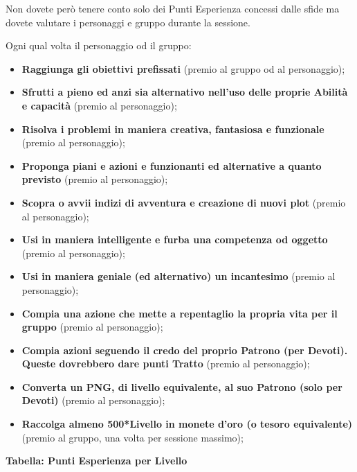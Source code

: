 \begin{multicols}{2}
\medskip

Non dovete però tenere conto solo dei Punti Esperienza concessi dalle sfide ma dovete valutare i personaggi e gruppo durante la sessione.

Ogni qual volta il personaggio od il gruppo:\label{puntiesperienzabonus}
\begin{itemize}[leftmargin=*] \setlength{\itemsep}{0pt}
\item \textbf{Raggiunga gli obiettivi prefissati} (premio al gruppo od al personaggio);
\item \textbf{Sfrutti a pieno ed anzi sia alternativo nell'uso delle proprie Abilità e capacità} (premio al personaggio);
\item \textbf{Risolva i problemi in maniera creativa, fantasiosa e funzionale} (premio al personaggio);
\item \textbf{Proponga piani e azioni e funzionanti ed alternative a quanto previsto} (premio al personaggio);
\item \textbf{Scopra o avvii indizi di avventura e creazione di nuovi plot} (premio al personaggio);
\item \textbf{Usi in maniera intelligente e furba una competenza od oggetto} (premio al personaggio);
\item \textbf{Usi in maniera geniale (ed alternativo) un incantesimo} (premio al personaggio);
\item \textbf{Compia una azione che mette a repentaglio la propria vita per il gruppo} (premio al personaggio);
\item \textbf{Compia azioni seguendo il credo del proprio Patrono (per Devoti). Queste dovrebbero dare punti Tratto} (premio al personaggio);
\item \textbf{Converta un PNG, di livello equivalente, al suo Patrono (solo per Devoti)} (premio al personaggio);
\item \textbf{Raccolga almeno 500*Livello in monete d'oro (o tesoro equivalente)} (premio al gruppo, una volta per sessione massimo);
\end{itemize}

\medskip

\textbf{Tabella: Punti Esperienza per Livello}\label{tabellapuntiesperienza}


\end{multicols}
